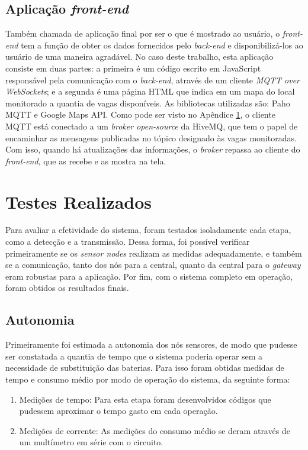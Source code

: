\documentclass[oneside,openright,12pt]{ufsm_2015} %
\begin{document}
    \subsection{Aplicação \textit{front-end}}
    Também chamada de aplicação final por ser o que é mostrado ao usuário, o \textit{front-end} tem a função de obter os dados fornecidos pelo \textit{back-end} e disponibilizá-los ao usuário de uma maneira agradável. No caso deste trabalho, esta aplicação consiste em duas partes: a primeira é um código escrito em JavaScript responsável pela comunicação com o \textit{back-end}, através de um cliente \textit{MQTT over WebSockets}; e a segunda é uma página HTML que indica em um mapa do local monitorado a quantia de vagas disponíveis. As bibliotecas utilizadas são: Paho MQTT e Google Maps API. Como pode ser visto no Apêndice \ref{}, o cliente MQTT está conectado a um \textit{broker open-source} da HiveMQ, que tem o papel de encaminhar as mensagens publicadas no tópico designado às vagas monitoradas. Com isso, quando há atualizações das informações, o \textit{broker} repassa ao cliente do \textit{front-end}, que as recebe e as mostra na tela.
    
    \section{Testes Realizados}
    Para avaliar a efetividade do sistema, foram testados isoladamente cada etapa, como a detecção e a transmissão. Dessa forma, foi possível verificar primeiramente se os \textit{sensor nodes} realizam as medidas adequadamente, e também se a comunicação, tanto dos nós para a central, quanto da central para o \textit{gateway} eram robustas para a aplicação. Por fim, com o sistema completo em operação, foram obtidos os resultados finais.
    
    \subsection{Autonomia} \label{subsection:autonomia}
    Primeiramente foi estimada a autonomia dos nós sensores, de modo que pudesse ser constatada a quantia de tempo que o sistema poderia operar sem a necessidade de substituição das baterias. Para isso foram obtidas medidas de tempo e consumo médio por modo de operação do sistema, da seguinte forma:
    
    \begin{enumerate}
        \item Medições de tempo: Para esta etapa foram desenvolvidos códigos que pudessem aproximar o tempo gasto em cada operação. 
        
        \item Medições de corrente: As medições do consumo médio se deram através de um multímetro em série com o circuito.
    \end{enumerate}
    
\end{document}
